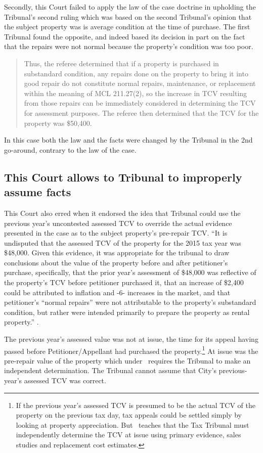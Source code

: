 \documentclass[12pt,\documentclassflag]{michiganCourtOfAppealsBrief}
\begin{document}
Secondly, this Court failed to apply the law of the case doctrine in upholding the Tribunal's second ruling which was based on the second Tribunal's opinion that the subject property was is average condition at the time of purchase. The first Tribunal found the opposite, and indeed based its decision in part on the fact that the repairs were not normal because the  property's condition was too poor.

\begin{quote}
Thus, the referee determined that if a property is purchased in substandard condition, any repairs
done on the property to bring it into good repair do not constitute normal repairs, maintenance, or
replacement within the meaning of MCL 211.27(2), so the increase in TCV resulting from those
repairs can be immediately considered in determining the TCV for assessment purposes. The
referee then determined that the TCV for the property was \$50,400.
\end{quote}

In this case both the law and the facts were changed by the Tribunal in the 2nd go-around, contrary to the law of the case.

\subsection{This Court allows to Tribunal to improperly assume facts}

This Court also erred when it endorsed the idea that Tribunal could use the previous year's uncontested assessed TCV to override the actual evidence presented in the case as to the subject property's pre-repair TCV. ``It is undisputed that the assessed
TCV of the property for the 2015 tax year was \$48,000. Given this evidence, it was appropriate
for the tribunal to draw conclusions about the value of the property before and after petitioner's
purchase, specifically, that the prior year's assessment of \$48,000 was reflective of the property's
TCV before petitioner purchased it, that an increase of \$2,400 could be attributed to inflation and 
-6-
increases in the market, and that petitioner's “normal repairs” were not attributable to the
property's substandard condition, but rather were intended primarily to prepare the property as
rental property.'' .

The previous year's assessed value was not at issue, the time for its appeal having passed before Petitioner/Appellant had purchased the property.\footnote{If the previous year's assessed TCV is presumed to be the actual TCV of the property on the previous tax day, tax appeals could be settled simply by looking at property appreciation. But \cite{Jones & Laughlin}\ teaches that the Tax Tribunal must independently determine the TCV at issue using primary evidence, sales studies and replacement cost estimates.} At issue was the pre-repair value of the property which under \cite{Jones & Laughlin}\ requires the Tribunal to make an independent  determination. The Tribunal cannot assume that City's previous-year's assessed TCV was correct.
\end{document}
